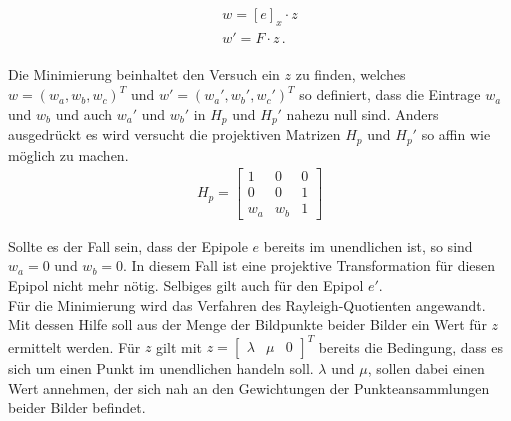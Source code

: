 
\begin{gather}
	w = [e]_x \cdot z \label{eq:w}\\ 
	w'= F\cdot z \label{eq:w'} \, .
\end{gather}\\


Die Minimierung beinhaltet den Versuch ein $z$ zu finden, welches $w = (w_a,w_b,w_c)^T$ und $w'=(w_a',w_b',w_c')^T$ so definiert, dass die Eintrage $w_a$ und $w_b$ und auch $w_a'$ und $w_b'$ in $H_p$ und $H_p'$ nahezu null sind. Anders ausgedrückt es wird versucht die projektiven Matrizen $H_p$ und $H_p'$ so affin wie möglich zu machen\cite{ZZ}.\\ 


\begin{gather}
	H_p = 	\begin{bmatrix}
		1&0&0\\
		0&0&1\\
		w_a&w_b&1
	\end{bmatrix}
\end{gather}


Sollte es der Fall sein, dass der Epipole $e$ bereits im unendlichen ist, so sind $w_a = 0$ und $w_b = 0$. In diesem Fall ist eine projektive Transformation für diesen Epipol nicht mehr nötig. Selbiges gilt auch für den Epipol $e'$.\\

Für die Minimierung wird das Verfahren des Rayleigh-Quotienten angewandt. Mit dessen Hilfe soll aus der Menge der Bildpunkte beider Bilder ein Wert für $z$ ermittelt werden\cite{rayleigh}. Für $z$ gilt mit $z = \begin{bmatrix}\lambda&\mu&0\end{bmatrix}^T$ bereits die Bedingung, dass es sich um einen Punkt im unendlichen handeln soll. $\lambda$ und $\mu$, sollen dabei einen Wert annehmen, der sich nah an den Gewichtungen der Punkteansammlungen beider Bilder befindet\cite{ZZ}. \\

